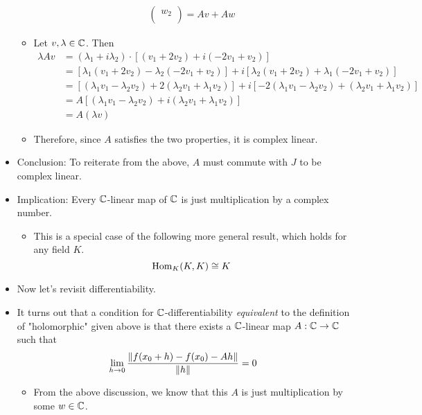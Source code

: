 \documentclass[../notes.tex]{subfiles}
\begin{document}
\begin{itemize}
\begin{itemize}
\begin{align*}
\begin{pmatrix}
                w_2\\
            \end{pmatrix}
            = Av+Aw
        \end{align*}
        \item Let $v,\lambda\in\mathbb{C}$. Then
        \begin{align*}
            \lambda Av &= (\lambda_1+i\lambda_2)\cdot[(v_1+2v_2)+i(-2v_1+v_2)]\\
            &= [\lambda_1(v_1+2v_2)-\lambda_2(-2v_1+v_2)]+i[\lambda_2(v_1+2v_2)+\lambda_1(-2v_1+v_2)]\\
            &= [(\lambda_1v_1-\lambda_2v_2)+2(\lambda_2v_1+\lambda_1v_2)]+i[-2(\lambda_1v_1-\lambda_2v_2)+(\lambda_2v_1+\lambda_1v_2)]\\
            &= A[(\lambda_1v_1-\lambda_2v_2)+i(\lambda_2v_1+\lambda_1v_2)]\\
            &= A(\lambda v)
        \end{align*}
        \item Therefore, since $A$ satisfies the two properties, it is complex linear.
    \end{itemize}
    \item Conclusion: To reiterate from the above, $A$ must commute with $J$ to be complex linear.
    \item Implication: Every $\mathbb{C}$-linear map of $\mathbb{C}$ is just multiplication by a complex number.
    \begin{itemize}
        \item This is a special case of the following more general result, which holds for any field $K$.
        \begin{equation*}
            \operatorname{Hom}_K(K,K) \cong K
        \end{equation*}
    \end{itemize}
    \item Now let's revisit differentiability.
    \item It turns out that a condition for $\mathbb{C}$-differentiability \emph{equivalent} to the definition of "holomorphic" given above is that there exists a $\mathbb{C}$-linear map $A:\mathbb{C}\to\mathbb{C}$ such that
    \begin{equation*}
        \lim_{h\to 0}\frac{\norm{f(x_0+h)-f(x_0)-Ah}}{\norm{h}} = 0
    \end{equation*}
    \begin{itemize}
        \item From the above discussion, we know that this $A$ is just multiplication by some $w\in\mathbb{C}$.

\end{itemize}
\end{itemize}
\end{document}
